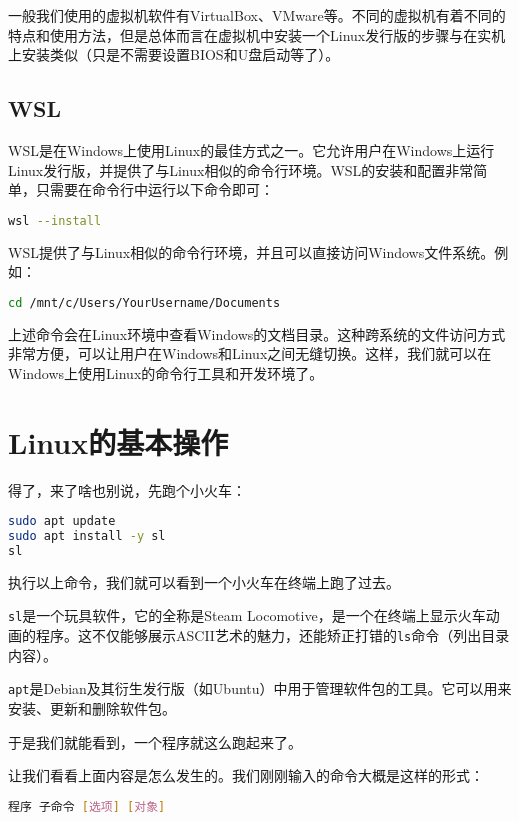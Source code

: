 \documentclass[../main.tex]{subfiles}
\begin{document}
一般我们使用的虚拟机软件有VirtualBox、VMware等。不同的虚拟机有着不同的特点和使用方法，但是总体而言在虚拟机中安装一个Linux发行版的步骤与在实机上安装类似（只是不需要设置BIOS和U盘启动等了）。

\subsection{WSL}

WSL是在Windows上使用Linux的最佳方式之一。它允许用户在Windows上运行Linux发行版，并提供了与Linux相似的命令行环境。WSL的安装和配置非常简单，只需要在命令行中运行以下命令即可：
\begin{lstlisting}[language=bash]
    wsl --install
\end{lstlisting}
WSL提供了与Linux相似的命令行环境，并且可以直接访问Windows文件系统。例如：

\begin{lstlisting}[language=bash]
    cd /mnt/c/Users/YourUsername/Documents
\end{lstlisting}
上述命令会在Linux环境中查看Windows的文档目录。这种跨系统的文件访问方式非常方便，可以让用户在Windows和Linux之间无缝切换。这样，我们就可以在Windows上使用Linux的命令行工具和开发环境了。

\section{Linux的基本操作}

得了，来了啥也别说，先跑个小火车：

\begin{lstlisting}[language=bash]
sudo apt update
sudo apt install -y sl
sl
\end{lstlisting}

执行以上命令，我们就可以看到一个小火车在终端上跑了过去。

\texttt{sl}是一个玩具软件，它的全称是Steam Locomotive，是一个在终端上显示火车动画的程序。这不仅能够展示ASCII艺术的魅力，还能矫正打错的\texttt{ls}命令（列出目录内容）。

\texttt{apt}是Debian及其衍生发行版（如Ubuntu）中用于管理软件包的工具。它可以用来安装、更新和删除软件包。

于是我们就能看到，一个程序就这么跑起来了。

让我们看看上面内容是怎么发生的。我们刚刚输入的命令大概是这样的形式：
\begin{lstlisting}[language=bash]
程序 子命令 [选项] [对象]
\end{lstlisting}
\end{document}
